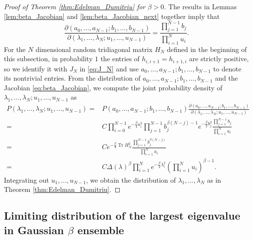 \documentclass[11pt, a4paper]{article}
\numberwithin{equation}{section}
\DeclareMathOperator{\Tr}{Tr}
\theoremstyle{definition}
\theoremstyle{remark}
\begin{document}
\begin{proof}[Proof of Theorem \ref{thm:Edelman_Dumitriu} for $\beta > 0$]
  The results in Lemmas \ref{lem:beta_Jacobian} and \ref{lem:beta_Jacobian_next} together imply that
  \begin{equation}
    \frac{\partial(a_0, \dotsc, a_{N - 1}; b_1, \dotsc, b_{N - 1})}{\partial(\lambda_1, \dotsc, \lambda_N; u_1, \dotsc, u_{N - 1})} = \frac{\prod^{N - 1}_{j = 1} b_j}{\prod^N_{i = 1} u_i}.
  \end{equation}
  For the $N$ dimensional random tridiagonal matrix $H_N$ defined in the beginning of this subsection, in probability $1$ the entries of $h_{i, i + 1} = h_{i + 1, i}$ are strictly positive, so we identify it with $J_N$ in \eqref{eq:J_N} and use $a_0, \dotsc, a_{N - 1}; b_1, \dotsc, b_{N - 1}$ to denote its nontrivial entries. From the distribution of $a_0, \dotsc, a_{N - 1}; b_1, \dotsc, b_{N - 1}$ and the Jacobian \eqref{eq:beta_Jacobian}, we compute the joint probability density of $\lambda_1, \dotsc, \lambda_N; u_1, \dotsc, u_{N - 1}$ as
  \begin{equation}
    \begin{split}
      P(\lambda_1, \dotsc, \lambda_N; u_1, \dotsc, u_{N - 1}) = {}& P(a_0, \dotsc, a_{N - 1}; b_1, \dotsc, b_{N - 1}) \frac{\partial(a_0, \dotsc, a_{N - 1}; b_1, \dotsc, b_{N - 1})}{\partial(\lambda_1, \dotsc, \lambda_N; u_1, \dotsc, u_{N - 1})} \\
      = {}& C \prod^{N - 1}_{i = 0} e^{-\frac{\beta}{4} a^2_i} \prod^{N - 1}_{j = 1} b^{\beta(N - j) - 1}_j e^{-\frac{\beta}{2} b^2_j} \frac{\prod^{N - 1}_{j = 1} b_j}{\prod^N_{i = 1} u_i} \\
      = {}& C e^{-\frac{\beta}{4} \Tr H^2_N} \frac{\prod^{N - 1}_{j = 1} b^{\beta(N - j)}_j}{\prod^N_{i = 1} u_i} \\
      = {}& C \Delta(\lambda)^{\beta} \prod^N_{i = 1} e^{-\frac{\beta}{4} \lambda^2_i} \left( \prod^N_{i = 1} u_i \right)^{\beta - 1}.
    \end{split}
  \end{equation}
  Integrating out $u_1, \dotsc, u_{N - 1}$, we obtain the distribution of $\lambda_1, \dotsc, \lambda_N$ as in Theorem \ref{thm:Edelman_Dumitriu}.
\end{proof}

\subsection{Limiting distribution of the largest eigenvalue in Gaussian $\beta$ ensemble}
\end{document}
